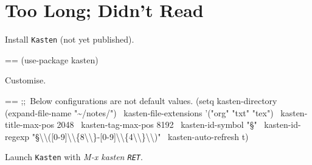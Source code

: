 \documentclass{book}
\makeatletter
\newcommand\Texinfocommandstyletextkbd[1]{{\ttfamily\textsl{#1}}}%
\newenvironment{Texinfopreformatted}{%
  \par\GNUTobeylines\obeyspaces\frenchspacing\parskip=\z@\parindent=\z@}{}
{\catcode`\^^M=13 \gdef\GNUTobeylines{\catcode`\^^M=13 \def^^M{\null\par}}}
\newenvironment{Texinfoindented}{\begin{list}{}{}\item\relax}{\end{list}}
\renewcommand{\_}{\Texinfounderscore\discretionary{}{}{}}
\makeatother
\begin{document}
\chapter{{Too Long; Didn't Read}}
\label{anchor:Too-Long_003b-Didn_0027t-Read}%

\begin{enumerate}[start=1]
\item Install \texttt{Kasten} (not yet published).
\begin{Texinfoindented}
\begin{Texinfopreformatted}%
\ttfamily (use-package kasten)
\end{Texinfopreformatted}
\end{Texinfoindented}
\item Customise.
\begin{Texinfoindented}
\begin{Texinfopreformatted}%
\ttfamily ;;\ Below configurations are not default values.
(setq kasten-directory (expand-file-name "\~{}/notes/")
\      kasten-file-extensions '("org" "txt" "tex")
\      kasten-title-max-pos 2048
\      kasten-tag-max-pos 8192
\      kasten-id-symbol "§"
\      kasten-id-regexp "§\textbackslash{}\textbackslash{}([0-9]\textbackslash{}\textbackslash{}\{8\textbackslash{}\textbackslash{}\}-[0-9]\textbackslash{}\textbackslash{}\{4\textbackslash{}\textbackslash{}\}\textbackslash{}\textbackslash{})"
\      kasten-auto-refresh t)
\end{Texinfopreformatted}
\end{Texinfoindented}
\item Launch \texttt{Kasten} with \Texinfocommandstyletextkbd{M-x kasten \texttt{RET}}.
\end{enumerate}
\end{document}

